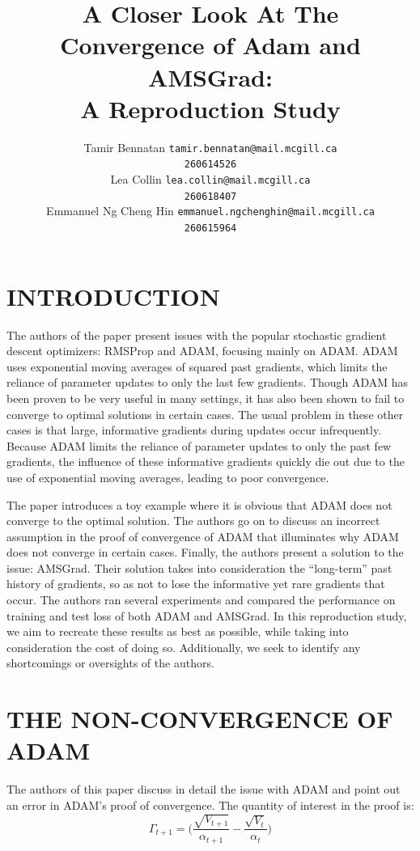 \documentclass[letterpaper, 10 pt, conference]{ieeeconf}  %
\title{\LARGE \bf
A Closer Look At The Convergence of Adam and AMSGrad:\\A Reproduction Study
}
\author{ 
	\parbox{2 in}{\centering Tamir Bennatan
         {\tt\small tamir.bennatan@mail.mcgill.ca\\}
         {\tt\small 260614526}}
         \hspace*{ 0.3 in}
         \parbox{2 in}{\centering Lea Collin
         {\tt\small lea.collin@mail.mcgill.ca\\}
         {\tt\small 260618407}}
         \hspace*{0.3 in}
         \parbox{2 in}{\centering Emmanuel Ng Cheng Hin
         {\tt\small emmanuel.ngchenghin@mail.mcgill.ca\\}
         {\tt\small 260615964}}
}
\begin{document}
\maketitle
\thispagestyle{empty}
\pagestyle{empty}



\section{INTRODUCTION}

	The authors of the paper present issues with the popular stochastic gradient descent optimizers: RMSProp and ADAM, focusing mainly on ADAM. ADAM uses exponential moving averages of squared past gradients, which limits the reliance of parameter updates to only the last few gradients. Though ADAM has been proven to be very useful in many settings, it has also been shown to fail to converge to optimal solutions in certain cases. The usual problem in these other cases is that large, informative gradients during updates occur infrequently. Because ADAM limits the reliance of parameter updates to only the past few gradients, the influence of these informative gradients quickly die out due to the use of exponential moving averages, leading to poor convergence. \par
    The paper introduces a toy example where it is obvious that ADAM does not converge to the optimal solution. The authors go on to discuss an incorrect assumption in the proof of convergence of ADAM that illuminates why ADAM does not converge in certain cases. Finally, the authors present a solution to the issue: AMSGrad. Their solution takes into consideration the ``long-term'' past history of gradients, so as not to lose the informative yet rare gradients that occur. The authors ran several experiments and compared the performance on training and test loss of both ADAM and AMSGrad. In this reproduction study, we aim to recreate these results as best as possible, while taking into consideration the cost of doing so. Additionally, we seek to identify any shortcomings or oversights of the authors. \newline
     
\section{THE NON-CONVERGENCE OF ADAM}
The authors of this paper discuss in detail the issue with ADAM and point out an error in ADAM's proof of convergence. The quantity of interest in the proof is:
$$
	\Gamma_{t+1} = \Bigg(\frac{\sqrt{V_{t+1}}}{\alpha_{t+1}} - \frac{\sqrt{V_{t}}}{\alpha_{t}} \Bigg) 
$$
\end{document}
